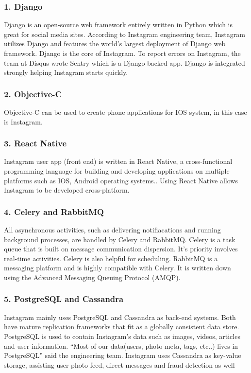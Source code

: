 \documentclass[a4paper, 11pt]{report}
\begin{document}
\subsubsection{1. Django}
 Django is an open-source web framework entirely written in Python which is great for social media sites. According to Instagram engineering team, Instagram utilizes Django and features the world’s largest deployment of Django web framework\cite{ky3}. Django is the core of Instagram. To report errors on Instagram, the team at Disqus wrote Sentry which is a Django backed app. Django is integrated strongly helping Instagram starts quickly\cite{ky4}. 
\subsubsection{2. Objective-C}
Objective-C can be used to create phone applications for IOS system, in this case is Instagram.
\subsubsection{3. React Native}
Instagram user app (front end) is written in React Native, a cross-functional programming language for building and developing applications on multiple platforms such as IOS, Android operating systems.\cite{ky7}. Using React Native allows Instagram to be developed cross-platform.
\subsubsection{4. Celery and RabbitMQ}
All asynchronous activities, such as delivering notifiacations and running background processes, are handled by Celery and RabbitMQ. Celery is a task queue that is built on message communication dispersion. It's priority involves real-time activities. Celery is also helpful for scheduling. RabbitMQ is a messaging platform and is highly compatible with Celery. It is written down using the Advanced Messaging Queuing Protocol (AMQP)\cite{ky4}.
\subsubsection{5. PostgreSQL and Cassandra}
Instagram mainly uses PostgreSQL and Cassandra as back-end systems. Both have mature replication frameworks that fit as a globally consistent data store\cite{ky5}. PostgreSQL is used to contain Instagram’s data such as images, videos, articles and user information\cite{ky4}. “Most of our data(users, photo meta, tags, etc..) lives in PostgreSQL” said the engineering team. Instagram uses Cassandra as key-value storage, assisting user photo feed, direct messages and fraud detection as well\cite{ky6}
\end{document}
